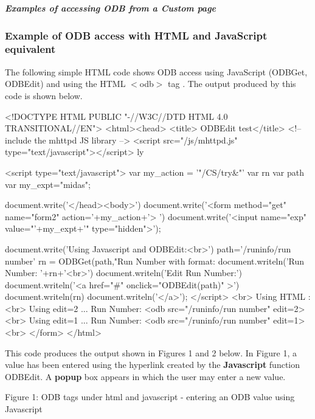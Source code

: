 \subparagraph{Examples of accessing ODB from a Custom page}\label{RC_mhttpd_custom_ODB_access_examples}
\par




\par
 \hypertarget{RC_mhttpd_custom_ODB_access_examples_RC_mhttpd_js_example1}{}\subsubsection{Example of ODB access with HTML and JavaScript equivalent}\label{RC_mhttpd_custom_ODB_access_examples_RC_mhttpd_js_example1}
The following simple HTML code shows ODB access using JavaScript (ODBGet, ODBEdit) and using the HTML  $<$odb$>$ tag . The output produced by this code is shown below. 
\begin{DoxyCode}
<!DOCTYPE HTML PUBLIC "-//W3C//DTD HTML 4.0 TRANSITIONAL//EN">
<html><head>
<title> ODBEdit test</title>
<!-- include the mhttpd JS library -->
\htmlonly <script src="/js/mhttpd.js" type="text/javascript"></script> \endhtmlon
      ly

\htmlonly <script type="text/javascript">
var my_action = '"/CS/try&"'
var rn
var path
var my_expt="midas";

document.write('</head><body>')
document.write('<form method="get" name="form2" action='+my_action+'> ')
document.write('<input name="exp" value="'+my_expt+'" type="hidden">');

document.write('Using Javascript and ODBEdit:<br>')
path='/runinfo/run number'
rn = ODBGet(path,"Run Number with format: %
document.writeln('Run Number: '+rn+'<br>')
document.writeln('Edit Run Number:')
document.writeln('<a href="#" onclick="ODBEdit(path)" >')
document.writeln(rn)
document.writeln('</a>');
</script> \endhtmlonly
<br>
Using HTML :
<br>
Using edit=2 ...  Run Number:
<odb src="/runinfo/run number" edit=2>
<br>
Using edit=1 ...  Run Number:
<odb src="/runinfo/run number" edit=1>
<br>
</form>
</html>
\end{DoxyCode}
 \par


This code produces the output shown in Figures 1 and 2 below. In Figure 1, a value has been entered using the hyperlink created by the {\bfseries Javascript} function ODBEdit. A {\bfseries popup} box appears in which the user may enter a new value.

\par
\par
\par
 \begin{center} Figure 1: ODB tags under html and javascript -\/ entering an ODB value using Javascript \par
\par
\par
  \end{center}  \par
\par
\par


